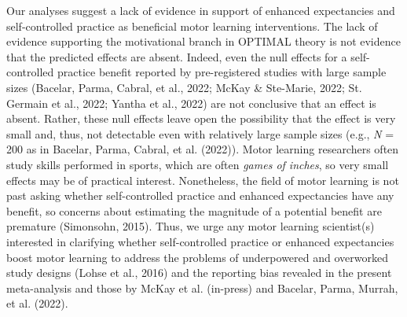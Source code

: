 \documentclass[
  man, donotrepeattitle,floatsintext]{apa7}
\begin{document}
Our analyses suggest a lack of evidence in support of enhanced expectancies and self-controlled practice as beneficial motor learning interventions. The lack of evidence supporting the motivational branch in OPTIMAL theory is not evidence that the predicted effects are absent. Indeed, even the null effects for a self-controlled practice benefit reported by pre-registered studies with large sample sizes (Bacelar, Parma, Cabral, et al., 2022; McKay \& Ste-Marie, 2022; St. Germain et al., 2022; Yantha et al., 2022) are not conclusive that an effect is absent. Rather, these null effects leave open the possibility that the effect is very small and, thus, not detectable even with relatively large sample sizes (e.g., \emph{N} = 200 as in Bacelar, Parma, Cabral, et al. (2022)). Motor learning researchers often study skills performed in sports, which are often \emph{games of inches}, so very small effects may be of practical interest. Nonetheless, the field of motor learning is not past asking whether self-controlled practice and enhanced expectancies have any benefit, so concerns about estimating the magnitude of a potential benefit are premature (Simonsohn, 2015). Thus, we urge any motor learning scientist(s) interested in clarifying whether self-controlled practice or enhanced expectancies boost motor learning to address the problems of underpowered and overworked study designs (Lohse et al., 2016) and the reporting bias revealed in the present meta-analysis and those by McKay et al. (in-press) and Bacelar, Parma, Murrah, et al. (2022).
\end{document}
